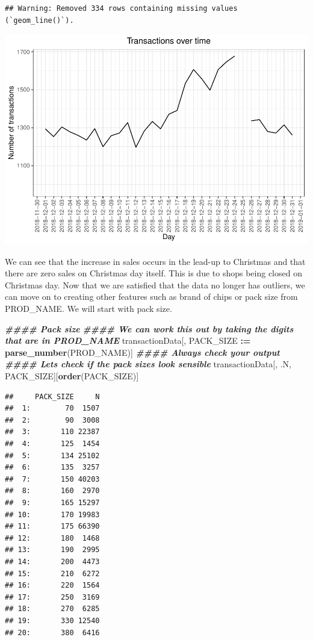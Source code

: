 \documentclass[
]{article}
\newenvironment{Shaded}{\begin{snugshade}}{\end{snugshade}}
\newcommand{\DocumentationTok}[1]{\textcolor[rgb]{0.56,0.35,0.01}{\textbf{\textit{#1}}}}
\newcommand{\FunctionTok}[1]{\textcolor[rgb]{0.13,0.29,0.53}{\textbf{#1}}}
\newcommand{\NormalTok}[1]{#1}
\newcommand{\SpecialCharTok}[1]{\textcolor[rgb]{0.81,0.36,0.00}{\textbf{#1}}}
\begin{document}
\begin{verbatim}
## Warning: Removed 334 rows containing missing values (`geom_line()`).
\end{verbatim}

\begin{center}\includegraphics{template_files/figure-latex/unnamed-chunk-8-1} \end{center}

We can see that the increase in sales occurs in the lead-up to Christmas
and that there are zero sales on Christmas day itself. This is due to
shops being closed on Christmas day. Now that we are satisfied that the
data no longer has outliers, we can move on to creating other features
such as brand of chips or pack size from PROD\_NAME. We will start with
pack size.

\begin{Shaded}
\begin{Highlighting}[]
\DocumentationTok{\#\#\#\# Pack size}
\DocumentationTok{\#\#\#\# We can work this out by taking the digits that are in PROD\_NAME}
\NormalTok{transactionData[, PACK\_SIZE }\SpecialCharTok{:=} \FunctionTok{parse\_number}\NormalTok{(PROD\_NAME)]}
\DocumentationTok{\#\#\#\# Always check your output}
\DocumentationTok{\#\#\#\# Let\textquotesingle{}s check if the pack sizes look sensible}
\NormalTok{transactionData[, .N, PACK\_SIZE][}\FunctionTok{order}\NormalTok{(PACK\_SIZE)]}
\end{Highlighting}
\end{Shaded}

\begin{verbatim}
##     PACK_SIZE     N
##  1:        70  1507
##  2:        90  3008
##  3:       110 22387
##  4:       125  1454
##  5:       134 25102
##  6:       135  3257
##  7:       150 40203
##  8:       160  2970
##  9:       165 15297
## 10:       170 19983
## 11:       175 66390
## 12:       180  1468
## 13:       190  2995
## 14:       200  4473
## 15:       210  6272
## 16:       220  1564
## 17:       250  3169
## 18:       270  6285
## 19:       330 12540
## 20:       380  6416
\end{verbatim}
\end{document}

